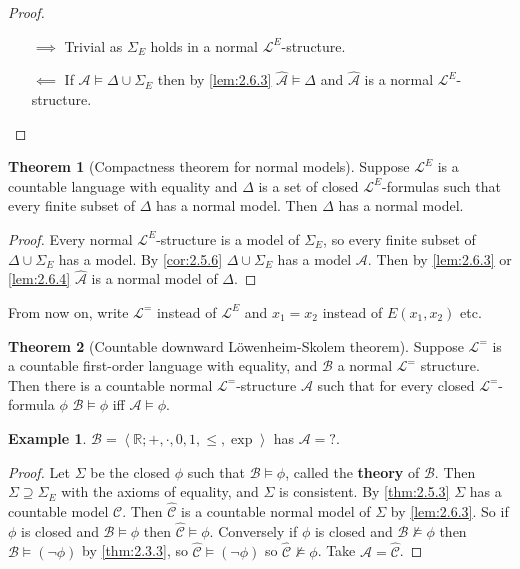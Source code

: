 \documentclass{article}
\newcommand{\R}{\mathbb{R}}
\newcommand{\A}{\mathcal{A}}
\renewcommand{\L}{\mathcal{L}}
\newcommand{\rb}[1]{\left( #1 \right)}
\newcommand{\ab}[1]{\left\langle #1 \right\rangle}
\newcommand{\notb}[1]{\rb{\neg #1}}
\theoremstyle{definition}\newtheorem{definition}{Definition}[subsection]
\theoremstyle{definition}\newtheorem{remark}[definition]{Remark}
\theoremstyle{definition}\newtheorem*{example}{Example}
\theoremstyle{definition}\newtheorem*{note}{Note}
\newtheorem{theorem}[definition]{Theorem}
\begin{document}
\begin{proof}
\hfill
\begin{itemize}
\item[$ \implies $] Trivial as $ \Sigma_E $ holds in a normal $ \L^E $-structure.
\item[$ \impliedby $] If $ \A \vDash \Delta \cup \Sigma_E $ then by \ref{lem:2.6.3} $ \widehat{\A} \vDash \Delta $ and $ \widehat{\A} $ is a normal $ \L^E $-structure.
\end{itemize}
\end{proof}

\begin{theorem}[Compactness theorem for normal models]
Suppose $ \L^E $ is a countable language with equality and $ \Delta $ is a set of closed $ \L^E $-formulas such that every finite subset of $ \Delta $ has a normal model. Then $ \Delta $ has a normal model.
\end{theorem}

\begin{proof}
Every normal $ \L^E $-structure is a model of $ \Sigma_E $, so every finite subset of $ \Delta \cup \Sigma_E $ has a model. By \ref{cor:2.5.6} $ \Delta \cup \Sigma_E $ has a model $ \A $. Then by \ref{lem:2.6.3} or \ref{lem:2.6.4} $ \widehat{\A} $ is a normal model of $ \Delta $.
\end{proof}

From now on, write $ \L^= $ instead of $ \L^E $ and $ x_1 = x_2 $ instead of $ E\rb{x_1, x_2} $ etc.


\begin{theorem}[Countable downward Löwenheim-Skolem theorem]
Suppose $ \L^= $ is a countable first-order language with equality, and $ \mathcal{B} $ a normal $ \L^= $ structure. Then there is a countable normal $ \L^= $-structure $ \A $ such that for every closed $ \L^= $-formula $ \phi $ $ \mathcal{B} \vDash \phi $ iff $ \A \vDash \phi $.
\end{theorem}

\begin{example}
$ \mathcal{B} = \ab{\R; +, \cdot, 0, 1, \le, \exp} $ has $ \A = ? $.
\end{example}

\begin{proof}
Let $ \Sigma $ be the closed $ \phi $ such that $ \mathcal{B} \vDash \phi $, called the \textbf{theory} of $ \mathcal{B} $. Then $ \Sigma \supseteq \Sigma_E $ with the axioms of equality, and $ \Sigma $ is consistent. By \ref{thm:2.5.3} $ \Sigma $ has a countable model $ \mathcal{C} $. Then $ \widehat{\mathcal{C}} $ is a countable normal model of $ \Sigma $ by \ref{lem:2.6.3}. So if $ \phi $ is closed and $ \mathcal{B} \vDash \phi $ then $ \widehat{\mathcal{C}} \vDash \phi $. Conversely if $ \phi $ is closed and $ \mathcal{B} \not\vDash \phi $ then $ \mathcal{B} \vDash \notb{\phi} $ by \ref{thm:2.3.3}, so $ \widehat{\mathcal{C}} \vDash \notb{\phi} $ so $ \widehat{\mathcal{C}} \not\vDash \phi $. Take $ \A = \widehat{\mathcal{C}} $.
\end{proof}
\end{document}

